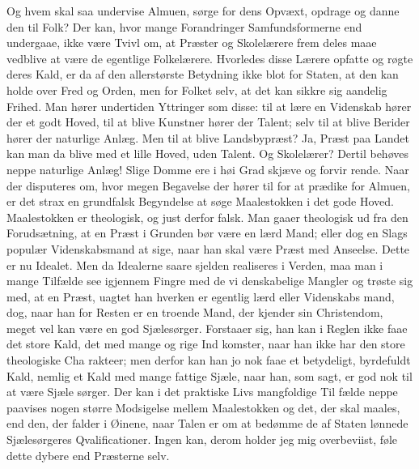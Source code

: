 \documentclass[12pt]{book}
\newcommand{\opage}[1]{\marginnote{\footnotesize\textit{[#1]}}}
\begin{document}
Og hvem skal saa undervise Almuen, sørge for dens
Opvæxt, opdrage og danne den til Folk? Der kan, hvor\-%
mange Forandringer Samfundsformerne end undergaae,
\opage{289}\setcounter{footnote}{0}%
ikke være Tvivl om, at Præster og Skolelærere frem\-%
deles maae vedblive at være de egentlige Folkelærere.
Hvorledes disse Lærere opfatte og røgte deres Kald, er
da af den allerstørste Betydning ikke blot for Staten, at
den kan holde over Fred og Orden, men for Folket
selv, at det kan sikkre sig aandelig Frihed. Man hører
undertiden Yttringer som disse: til at lære en Videnskab
hører der et godt Hoved, til at blive Kunstner hører
der Talent; selv til at blive Berider hører der naturlige
Anlæg. Men til at blive Landsbypræst? Ja, Præst paa
Landet kan man da blive med et lille Hoved, uden
Talent. Og Skolelærer? Dertil behøves neppe naturlige
Anlæg! Slige Domme ere i høi Grad skjæve og forvir\-%
rende. Naar der disputeres om, hvor megen Begavelse
der hører til for at prædike for Almuen, er det strax
en grundfalsk Begyndelse at søge Maalestokken i det
gode Hoved. Maalestokken er theologisk, og just derfor
falsk. Man gaaer theologisk ud fra den Forudsætning,
at en Præst i Grunden bør være en lærd Mand; eller
dog en Slags populær Videnskabsmand at sige, naar han
skal være Præst med Anseelse. Dette er nu Idealet.
Men da Idealerne saare sjelden realiseres i Verden, maa
man i mange Tilfælde see igjennem Fingre med de vi\-%
denskabelige Mangler og trøste sig med, at en Præst,
uagtet han hverken er egentlig lærd eller Videnskabs\-%
mand, dog, naar han for Resten er en troende Mand,
der kjender sin Christendom, meget vel kan være en
god Sjælesørger. Forstaaer sig, han kan i Reglen ikke
faae det store Kald, det med mange og rige Ind\-%
komster, naar han ikke har den store theologiske Cha\-%
rakteer; men derfor kan han jo nok faae et betydeligt,
byrdefuldt Kald, nemlig et Kald med mange fattige
Sjæle, naar han, som sagt, er god nok til at være Sjæle\-%
sørger. Der kan i det praktiske Livs mangfoldige Til\-%
\opage{290}\setcounter{footnote}{0}%
fælde neppe paavises nogen større Modsigelse mellem
Maalestokken og det, der skal maales, end den, der
falder i Øinene, naar Talen er om at bedømme de af
Staten lønnede Sjælesørgeres Qvalificationer. Ingen kan,
derom holder jeg mig overbeviist, føle dette dybere end
Præsterne selv.
\end{document}
